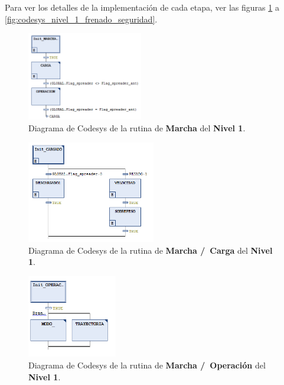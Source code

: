 \documentclass[11pt]{article}
\begin{document}
Para ver los detalles de la implementación de cada etapa, ver las figuras \ref{fig:codesys_nivel_1_marcha} a \ref{fig:codesys_nivel_1_frenado_seguridad}.

\begin{figure}[!h]
	\centering
	\includegraphics[width=0.45\textwidth]{images/codesys_nivel_1_marcha.png}
	\caption{Diagrama de Codesys de la rutina de \textbf{Marcha} del \textbf{Nivel 1}.}
	\label{fig:codesys_nivel_1_marcha}
\end{figure}

\begin{figure}
	\centering
	\includegraphics[width=0.5\textwidth]{images/codesys_nivel_1_marcha_carga.png}
	\caption{Diagrama de Codesys de la rutina de \textbf{Marcha /\ Carga} del \textbf{Nivel 1}.}
	\label{fig:codesys_nivel_1_marcha_carga}
\end{figure}

\begin{figure}
	\centering
	\includegraphics[width=0.35\textwidth]{images/codesys_nivel_1_marcha_operacion.png}
	\caption{Diagrama de Codesys de la rutina de \textbf{Marcha /\ Operación} del \textbf{Nivel 1}.}
	\label{fig:codesys_nivel_1_marcha_operacion}
\end{figure}
\end{document}
